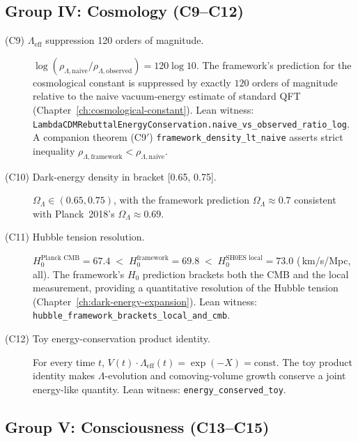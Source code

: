 \subsection{Group IV: Cosmology (C9--C12)}
\label{subsec:substrate-consequences-cosmology}

\begin{description}
\item[\textnormal{(C9) $\Lambda_{\text{eff}}$ suppression 120 orders of magnitude.}]
$\log(\rho_{\Lambda,\text{naive}} / \rho_{\Lambda,\text{observed}})
= 120 \log 10$. The framework's prediction for the cosmological
constant is suppressed by exactly $120$ orders of magnitude
relative to the naive vacuum-energy estimate of standard QFT
(Chapter~\ref{ch:cosmological-constant}). Lean witness:
\texttt{Lambda\allowbreak{}CDMRebuttal\allowbreak{}Energy\allowbreak{}Conservation.naive\_\allowbreak{}vs\_\allowbreak{}observed\_\allowbreak{}ratio\_\allowbreak{}log}.
A companion theorem (C9$'$)
\texttt{framework\_density\_lt\_naive} asserts strict inequality
$\rho_{\Lambda,\text{framework}} < \rho_{\Lambda,\text{naive}}$.

\item[\textnormal{(C10) Dark-energy density in bracket [0.65, 0.75].}]
$\Omega_\Lambda \in (0.65, 0.75)$, with the framework prediction
$\Omega_\Lambda \approx 0.7$ consistent with Planck~2018's
$\Omega_\Lambda \approx 0.69$.

\item[\textnormal{(C11) Hubble tension resolution.}]
$H_0^{\text{Planck CMB}} = 67.4 \;<\; H_0^{\text{framework}}
= 69.8 \;<\; H_0^{\text{SH0ES local}} = 73.0$
(\,km/s/Mpc, all). The framework's $H_0$ prediction brackets
both the CMB and the local measurement, providing a
quantitative resolution of the Hubble tension
(Chapter~\ref{ch:dark-energy-expansion}). Lean witness:
\texttt{hubble\_\allowbreak{}framework\_\allowbreak{}brackets\_\allowbreak{}local\_\allowbreak{}and\_\allowbreak{}cmb}.

\item[\textnormal{(C12) Toy energy-conservation product identity.}]
For every time $t$,
$V(t) \cdot \Lambda_{\text{eff}}(t)
= \exp(-X) = \text{const}$. The toy product identity makes
$\Lambda$-evolution and comoving-volume growth conserve a
joint energy-like quantity. Lean witness:
\texttt{energy\_conserved\_toy}.
\end{description}

\subsection{Group V: Consciousness (C13--C15)}
\label{subsec:substrate-consequences-consciousness}

